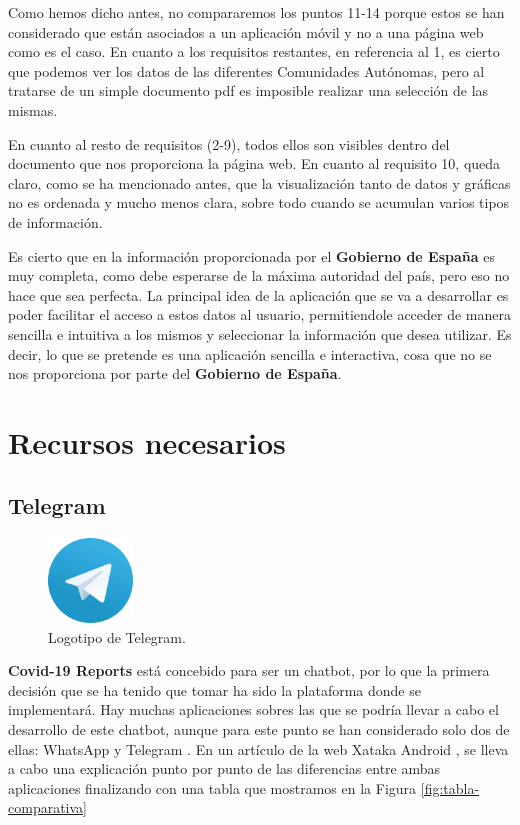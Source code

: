 Como hemos dicho antes, no compararemos los puntos 11-14 porque estos se han considerado que están asociados a un aplicación móvil y no a una página web como es el caso. En cuanto a los requisitos restantes, en referencia al 1, es cierto que podemos ver los datos de las diferentes Comunidades Autónomas, pero al tratarse de un simple documento pdf es imposible realizar una selección de las mismas.

En cuanto al resto de requisitos (2-9), todos ellos son visibles dentro del documento que nos proporciona la página web. En cuanto al requisito 10, queda claro, como se ha mencionado antes, que la visualización tanto de datos y gráficas no es ordenada y mucho menos clara, sobre todo cuando se acumulan varios tipos de información.

Es cierto que en la información proporcionada por el \textbf{Gobierno de España} es muy completa, como debe esperarse de la máxima autoridad del país, pero eso no hace que sea perfecta. La principal idea de la aplicación que se va a desarrollar es poder facilitar el acceso a estos datos al usuario, permitiendole acceder de manera sencilla e intuitiva a los mismos y seleccionar la información que desea utilizar. Es decir, lo que se pretende es una aplicación sencilla e interactiva, cosa que no se nos proporciona por parte del \textbf{Gobierno de España}.

\section{Recursos necesarios} \label{sec:recursos}

\subsection{Telegram}

\begin{figure}[H]
	\centering
	\includegraphics[width=0.2\textwidth]{img/telegram-icon}
	\caption{Logotipo de Telegram.}
\end{figure}

\textbf{Covid-19 Reports} está concebido para ser un chatbot, por lo que la primera decisión que se ha tenido que tomar ha sido la plataforma donde se implementará. Hay muchas aplicaciones sobres las que se podría llevar a cabo el desarrollo de este chatbot, aunque para este punto se han considerado solo dos de ellas: WhatsApp \cite{whatsapp} y Telegram \cite{telegram}. En un artículo de la web Xataka Android \cite{articulo-xataka}, se lleva a cabo una explicación punto por punto de las diferencias entre ambas aplicaciones finalizando con una tabla que mostramos en la Figura \ref{fig:tabla-comparativa}

